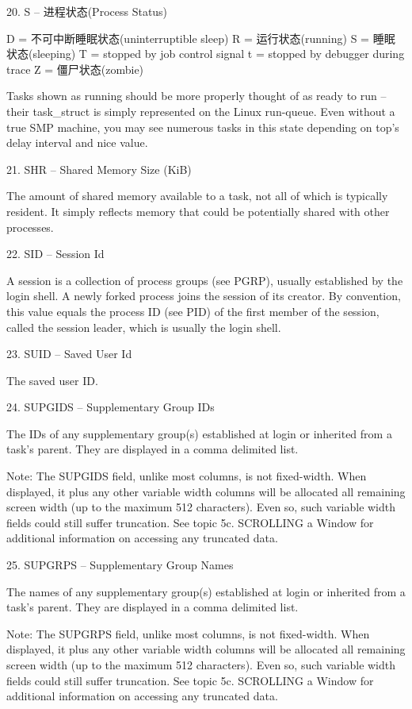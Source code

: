 20. S  --  进程状态(Process Status) \par

    D = 不可中断睡眠状态(uninterruptible sleep)
    R = 运行状态(running)
    S = 睡眠状态(sleeping)
    T = stopped by job control signal
    t = stopped by debugger during trace
    Z = 僵尸状态(zombie)

Tasks shown as running should be more properly thought of as ready to run --  their task\_struct is simply represented on the Linux run-queue.  Even without a true SMP machine, you may see numerous tasks in this state depending on  top's  delay  interval
and nice value.

21. SHR  --  Shared Memory Size (KiB)   \par
The amount of shared memory available to a task, not all of which is typically resident.  It simply reflects memory that could be potentially shared with other processes.

22. SID  --  Session Id \par
A  session  is  a  collection  of  process groups (see PGRP), usually established by the login shell.  A newly forked process joins the session of its creator.  By convention, this value equals the process ID (see PID) of the first member of the session,
called the session leader, which is usually the login shell.

23. SUID  --  Saved User Id \par
The saved user ID.

24. SUPGIDS  --  Supplementary Group IDs    \par
The IDs of any supplementary group(s) established at login or inherited from a task's parent.  They are displayed in a comma delimited list.

Note: The SUPGIDS field, unlike most columns, is not fixed-width.  When displayed, it plus any other variable width columns will be allocated all remaining screen width (up to the maximum 512 characters).  Even so, such variable width fields could  still
suffer truncation.  See topic 5c. SCROLLING a Window for additional information on accessing any truncated data.

25. SUPGRPS  --  Supplementary Group Names  \par
The names of any supplementary group(s) established at login or inherited from a task's parent.  They are displayed in a comma delimited list.

Note:  The SUPGRPS field, unlike most columns, is not fixed-width.  When displayed, it plus any other variable width columns will be allocated all remaining screen width (up to the maximum 512 characters).  Even so, such variable width fields could still
suffer truncation.  See topic 5c. SCROLLING a Window for additional information on accessing any truncated data.


